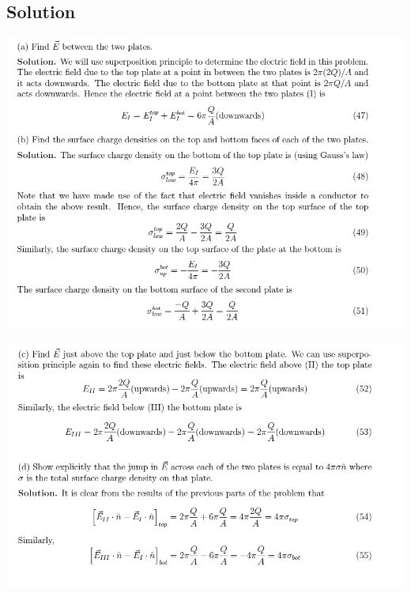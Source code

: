 \documentclass[solutions]{esg8022pset}
\begin{document}
\subsection{Solution}
  \begin{center}\includegraphics[width=\textwidth]{ps07_sol_08_1}\end{center}
  \begin{center}\includegraphics[width=\textwidth]{ps07_sol_08_2}\end{center}
\end{document}
